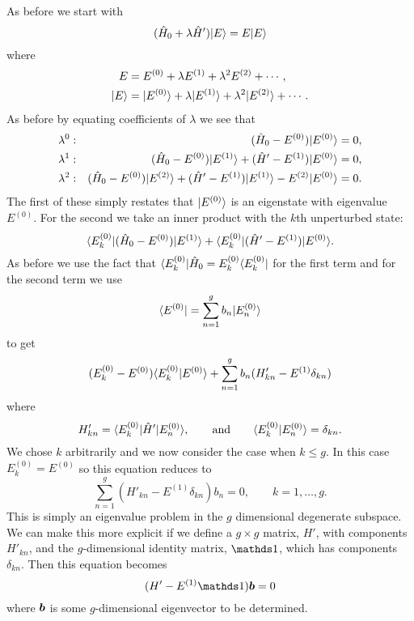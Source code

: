     As before we start with
    \[(\hat{H}_0 + \lambda\hat{H}')\vert {E} \rangle = E\vert {E} \rangle\]
    where
    \begin{align*}
        E &= E^{(0)} + \lambda E^{(1)} + \lambda^2E^{(2)} + \dotsb,\\
        \vert {E} \rangle &= \vert {E^{(0)}} \rangle + \lambda\vert {E^{(1)}} \rangle + \lambda^2\vert {E^{(2)}} \rangle + \dotsb.
    \end{align*}
    As before by equating coefficients of \(\lambda\) we see that
    \begin{align*}
        \lambda^0: && (\hat{H}_0 - E^{(0)})\vert {E^{(0)}} \rangle &= 0,\\
        \lambda^1: && (\hat{H}_0 - E^{(0)})\vert {E^{(1)}} \rangle + (\hat{H}' - E^{(1)})\vert {E^{(0)}} \rangle &= 0,\\
        \lambda^2: && (\hat{H}_0 - E^{(0)})\vert {E^{(2)}} \rangle + (\hat{H}' - E^{(1)})\vert {E^{(1)}} \rangle - E^{(2)}\vert {E^{(0)}} \rangle &= 0.
    \end{align*}
    The first of these simply restates that \(\vert {E^{(0)}} \rangle\) is an eigenstate with eigenvalue \(E^{(0)}\).
    For the second we take an inner product with the \(k\)th unperturbed state:
    \[\langle {E_k^{(0)}} \vert(\hat{H}_0 - E^{(0)})\vert {E^{(1)}} \rangle + \langle {E_k^{(0)}} \vert(\hat{H}' - E^{(1)})\vert {E^{(0)}} \rangle.\]
    As before we use the fact that \(\langle {E_k^{(0)}} \vert\hat{H}_0 = E_k^{(0)}\langle {E_k^{(0)}} \vert\) for the first term and for the second term we use
    \[\langle {E^{(0)}} \vert = \sum_{n=1}^g b_n\vert {E_n^{(0)}} \rangle\]
    to get
    \[(E_k^{(0)} - E^{(0)})\langle {E_k^{(0)}} \vert {E^{(0)}} \rangle + \sum_{n=1}^g b_n (H'_{kn} - E^{(1)}\delta_{kn})\]
    where
    \[H'_{kn} = \langle {E_k^{(0)}} \vert\hat{H}'\vert {E_n^{(0)}} \rangle, \qquad\text{and}\qquad \langle {E_k^{(0)}} \vert {E_n^{(0)}} \rangle = \delta_{kn}.\]
    We chose \(k\) arbitrarily and we now consider the case when \(k \le g\).
    In this case \(E_k^{(0)} = E^{(0)}\) so this equation reduces to
    \[\sum_{n=1}^g (H'_{kn} - E^{(1)}\delta_{kn})b_n = 0, \qquad k = 1, \dotsc, g.\]
    This is simply an eigenvalue problem in the \(g\) dimensional degenerate subspace.
    We can make this more explicit if we define a \(g\times g\) matrix, \(H'\), with components \(H'_{kn}\), and the \(g\)-dimensional identity matrix, \(\ident\), which has components \(\delta_{kn}\).
    Then this equation becomes
    \[(H' - E^{(1)}\ident)\vv{b} = 0\]
    where \(\bm{b}\) is some \(g\)-dimensional eigenvector to be determined.
    
